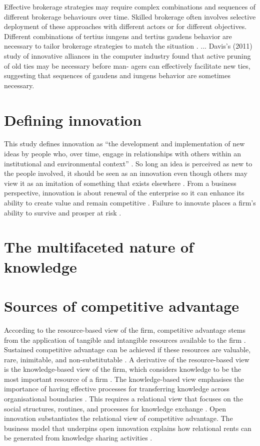 Effective brokerage strategies may require complex combinations and sequences of different brokerage behaviours over time. Skilled brokerage often involves selective deployment of these approaches with different actors or for different objectives. Different combinations of tertius iungens and tertius gaudens behavior are necessary to tailor brokerage strategies to match the situation \citep{obstfeld2014brokerage}. ... Davis’s (2011) study of innovative alliances in the computer industry found that active pruning of old ties may be necessary before man- agers can effectively facilitate new ties, suggesting that sequences of gaudens and iungens behavior are sometimes necessary.

\section{Defining innovation}

This study defines innovation as \enquote{the development and implementation of new ideas by people who, over time, engage in relationships with others within an institutional and environmental context} \citep{van1986central}. So long an idea is perceived as new to the people involved, it should be seen as an innovation even though others may view it as an imitation of something that exists elsewhere \citep{van1986central}. From a business perspective, innovation is about renewal of the enterprise so it can enhance its ability to create value and remain competitive \citep{schumpeter1950capitalism}. Failure to innovate places a firm's ability to survive and prosper at risk \citep{bessant2005managing}. \medskip 

\section{The multifaceted nature of knowledge}


\section{Sources of competitive advantage}

According to the resource-based view of the firm, competitive advantage stems from the application of tangible and intangible resources available to the firm \citep{wernerfelt1984resource,peteraf1993cornerstones}. Sustained competitive advantage can be achieved if these resources are valuable, rare, inimitable, and non-substitutable \citep{barney1991firm}. A derivative of the resource-based view is the knowledge-based view of the firm, which considers knowledge to be the most important resource of a firm \citep{grant1996toward}. The knowledge-based view emphasises the importance of having effective processes for transferring knowledge across organisational boundaries \citep{kogut1992knowledge,grant1996toward}. This requires a relational view that focuses on the social structures, routines, and processes for knowledge exchange \citep{dyer1998relational,nahapiet1998social}. Open innovation substantiates the relational view of competitive advantage. The business model that underpins open innovation explains how relational rents can be generated from knowledge sharing activities \citep{durst2013success}. \medskip

